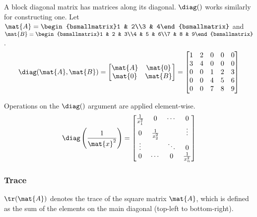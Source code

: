 A block diagonal matrix has matrices along its diagonal. $\diag()$ works
similarly for constructing one. Let
$\mat{A} = \begin{bsmallmatrix}1 & 2\\3 & 4\end{bsmallmatrix}$ and
$\mat{B} = \begin{bsmallmatrix}1 & 2 & 3\\4 & 5 & 6\\7 & 8 & 9\end{bsmallmatrix}$.
\begin{equation*}
  \diag(\mat{A}, \mat{B}) =
  \begin{bmatrix}
    \mat{A} & \mat{0} \\
    \mat{0} & \mat{B}
  \end{bmatrix} =
  \begin{bmatrix}
    1 & 2 & 0 & 0 & 0 \\
    3 & 4 & 0 & 0 & 0 \\
    0 & 0 & 1 & 2 & 3 \\
    0 & 0 & 4 & 5 & 6 \\
    0 & 0 & 7 & 8 & 9
  \end{bmatrix}
\end{equation*}

Operations on the $\diag()$ argument are applied element-wise.
\begin{equation*}
  \diag\left(\frac{1}{\mat{x}^2}\right) =
  \begin{bmatrix}
    \frac{1}{x_1^2} & 0 & \cdots & 0 \\
    0 & \frac{1}{x_2^2} & & \vdots \\
    \vdots & & \ddots & 0 \\
    0 & \cdots & 0 & \frac{1}{x_n^2}
  \end{bmatrix}
\end{equation*}

\subsubsection{Trace}
$\tr(\mat{A})$ denotes the trace of the square matrix $\mat{A}$, which is
defined as the sum of the elements on the main diagonal (top-left to
bottom-right).
